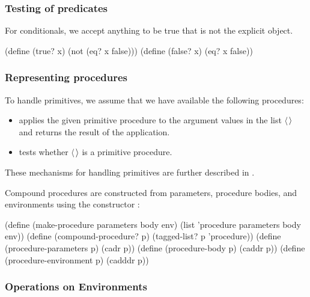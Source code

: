 \subsubsection*{Testing of predicates}

For conditionals, we accept anything to be true that is not the explicit
 object.

\begin{codeBlock}
(define (true? x)  (not (eq? x false)))
(define (false? x) (eq? x false))
\end{codeBlock}

\subsubsection*{Representing procedures}

To handle primitives, we assume that we have available the following
procedures:

\begin{itemize}
\item
{}

\noindent
applies the given primitive procedure to the argument values in the list
\( \langle \)\( \kern0.08em\rangle \) and returns the result of the application.

\item
{}

\noindent
tests whether \( \langle \)\( \kern0.08em\rangle \) is a primitive procedure.
\end{itemize}

\noindent
These mechanisms for handling primitives are further described in
.

Compound procedures are constructed from parameters, procedure bodies, and
environments using the constructor :

\begin{codeBlock}
(define (make-procedure parameters body env)
  (list 'procedure parameters body env))
(define (compound-procedure? p)
  (tagged-list? p 'procedure))
(define (procedure-parameters p) (cadr p))
(define (procedure-body p) (caddr p))
(define (procedure-environment p) (cadddr p))
\end{codeBlock}

\subsubsection*{Operations on Environments}


